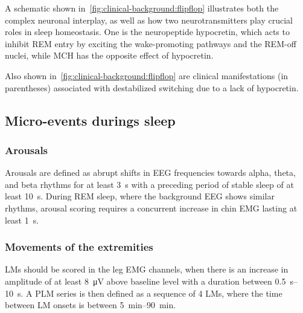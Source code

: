             A schematic shown in~\cref{fig:clinical-background:flipflop} illustrates both the complex neuronal interplay, as well as how two neurotransmitters play crucial roles in sleep homeostasis.
            One is the neuropeptide hypocretin, which acts to inhibit \ac{REM} entry by exciting the wake-promoting pathways and the \ac{REM}-off nuclei, while \ac{MCH} has the opposite effect of hypocretin.
            
            Also shown in~\cref{fig:clinical-background:flipflop} are clinical manifestations (in parentheses) associated with destabilized switching due to a lack of hypocretin.
            
        \subsection{Micro-events durings sleep}\label{sec:sleep-events}
            \subsubsection{Arousals}
            Arousals are defined as abrupt shifts in \ac{EEG} frequencies towards alpha, theta, and beta rhythms for at least \SI{3}{\second} with a preceding period of stable sleep of at least \SI{10}{\second}.
            During \ac{REM} sleep, where the background \ac{EEG} shows similar rhythms, arousal scoring requires a concurrent increase in chin \ac{EMG} lasting at least \SI{1}{\second}.
                \citep{Ermis2010}
            \subsubsection{Movements of the extremities}
            \Acp{LM} should be scored in the leg \ac{EMG} channels, when there is an increase in amplitude of at least \SI{8}{\micro\volt} above baseline level with a duration between \SIrange{0.5}{10}{\second}.
            A \ac{PLM} series is then defined as a sequence of 4 \acp{LM}, where the time between \ac{LM} onsets is between \SIrange{5}{90}{\minute}.

